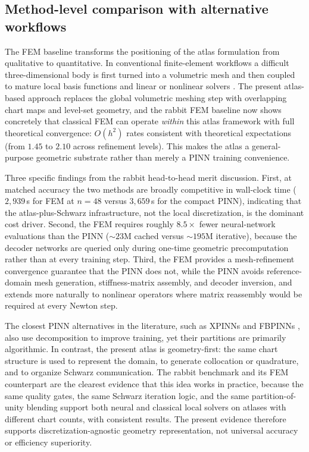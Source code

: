 \documentclass[sort&compress]{svjour3} %
\begin{document}
\subsection{Method-level comparison with alternative workflows}
The FEM baseline transforms the positioning of the atlas formulation from qualitative to quantitative. In conventional finite-element workflows a difficult three-dimensional body is first turned into a volumetric mesh and then coupled to mature local basis functions and linear or nonlinear solvers \citep{de_souza_neto_computational_2011}. The present atlas-based approach replaces the global volumetric meshing step with overlapping chart maps and level-set geometry, and the rabbit FEM baseline now shows concretely that classical FEM can operate \emph{within} this atlas framework with full theoretical convergence: $O(h^2)$ rates consistent with theoretical expectations (from $1.45$ to $2.10$ across refinement levels). This makes the atlas a general-purpose geometric substrate rather than merely a PINN training convenience.

Three specific findings from the rabbit head-to-head merit discussion. First, at matched accuracy the two methods are broadly competitive in wall-clock time ($2{,}939$\,s for FEM at $n=48$ versus $3{,}659$\,s for the compact PINN), indicating that the atlas-plus-Schwarz infrastructure, not the local discretization, is the dominant cost driver. Second, the FEM requires roughly $8.5\times$ fewer neural-network evaluations than the PINN (${\sim}23$M cached versus ${\sim}195$M iterative), because the decoder networks are queried only during one-time geometric precomputation rather than at every training step. Third, the FEM provides a mesh-refinement convergence guarantee that the PINN does not, while the PINN avoids reference-domain mesh generation, stiffness-matrix assembly, and decoder inversion, and extends more naturally to nonlinear operators where matrix reassembly would be required at every Newton step.

The closest PINN alternatives in the literature, such as XPINNs and FBPINNs \citep{shukla2021parallel,moseley2021fbpinns}, also use decomposition to improve training, yet their partitions are primarily algorithmic. In contrast, the present atlas is geometry-first: the same chart structure is used to represent the domain, to generate collocation or quadrature, and to organize Schwarz communication. The rabbit benchmark and its FEM counterpart are the clearest evidence that this idea works in practice, because the same quality gates, the same Schwarz iteration logic, and the same partition-of-unity blending support both neural and classical local solvers on atlases with different chart counts, with consistent results. The present evidence therefore supports discretization-agnostic geometry representation, not universal accuracy or efficiency superiority.
\end{document}
